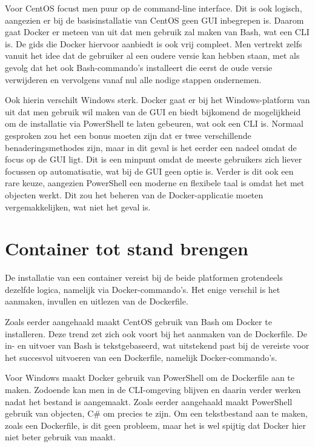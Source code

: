 Voor CentOS focust men puur op de command-line interface. Dit is ook logisch, aangezien er bij de basisinstallatie van CentOS geen GUI inbegrepen is. Daarom gaat Docker er meteen van uit dat men gebruik zal maken van Bash, wat een CLI is. De gids die Docker hiervoor aanbiedt is ook vrij compleet. Men vertrekt zelfs vanuit het idee dat de gebruiker al een oudere versie kan hebben staan, met als gevolg dat het ook Bash-commando's installeert die eerst de oude versie verwijderen en vervolgens vanaf nul alle nodige stappen ondernemen. \autocite{Mays2015}

Ook hierin verschilt Windows sterk. Docker gaat er bij het Windows-platform van uit dat men gebruik wil maken van de GUI en biedt bijkomend de mogelijkheid om de installatie via PowerShell te laten gebeuren, wat ook een CLI is. Normaal gesproken zou het een bonus moeten zijn dat er twee verschillende benaderingsmethodes zijn, maar in dit geval is het eerder een nadeel omdat de focus op de GUI ligt. Dit is een minpunt omdat de meeste gebruikers zich liever focussen op automatisatie, wat bij de GUI geen optie is. Verder is dit ook een rare keuze, aangezien PowerShell een moderne en flexibele taal is omdat het met objecten werkt. Dit zou het beheren van de Docker-applicatie moeten vergemakkelijken, wat niet het geval is. \autocite{Rickard2018}

\section{Container tot stand brengen}
De installatie van een container vereist bij de beide platformen grotendeels dezelfde logica, namelijk via Docker-commando's. Het enige verschil is het aanmaken, invullen en uitlezen van de Dockerfile.

Zoals eerder aangehaald maakt CentOS gebruik van Bash om Docker te installeren. Deze trend zet zich ook voort bij het aanmaken van de Dockerfile. De in- en uitvoer van Bash is tekstgebaseerd, wat uitstekend past bij de vereiste voor het succesvol uitvoeren van een Dockerfile, namelijk Docker-commando's. \autocite{Cezar2016}

Voor Windows maakt Docker gebruik van PowerShell om de Dockerfile aan te maken. Zodoende kan men in de CLI-omgeving blijven en daarin verder werken nadat het bestand is aangemaakt. Zoals eerder aangehaald maakt PowerShell gebruik van objecten, C\# om precies te zijn. Om een tekstbestand aan te maken, zoals een Dockerfile, is dit geen probleem, maar het is wel spijtig dat Docker hier niet beter gebruik van maakt. \autocite{Rickard2018}

